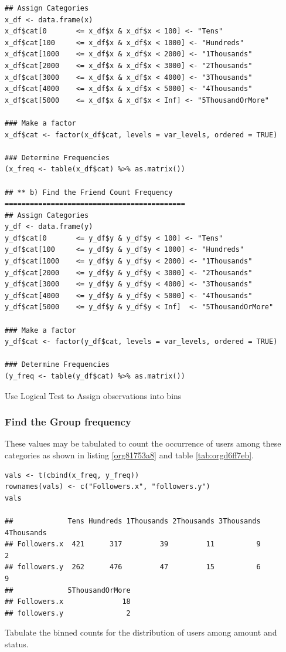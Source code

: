 \documentclass[11pt]{article}
\begin{document}
\begin{listing}[htbp]
\begin{verbatim}
## Assign Categories
x_df <- data.frame(x)
x_df$cat[0       <= x_df$x & x_df$x < 100] <- "Tens"
x_df$cat[100     <= x_df$x & x_df$x < 1000] <- "Hundreds"
x_df$cat[1000    <= x_df$x & x_df$x < 2000] <- "1Thousands"
x_df$cat[2000    <= x_df$x & x_df$x < 3000] <- "2Thousands"
x_df$cat[3000    <= x_df$x & x_df$x < 4000] <- "3Thousands"
x_df$cat[4000    <= x_df$x & x_df$x < 5000] <- "4Thousands"
x_df$cat[5000    <= x_df$x & x_df$x < Inf] <- "5ThousandOrMore"

### Make a factor
x_df$cat <- factor(x_df$cat, levels = var_levels, ordered = TRUE)

### Determine Frequencies
(x_freq <- table(x_df$cat) %>% as.matrix())

## ** b) Find the Friend Count Frequency ===========================================
## Assign Categories
y_df <- data.frame(y)
y_df$cat[0       <= y_df$y & y_df$y < 100] <- "Tens"
y_df$cat[100     <= y_df$y & y_df$y < 1000] <- "Hundreds"
y_df$cat[1000    <= y_df$y & y_df$y < 2000] <- "1Thousands"
y_df$cat[2000    <= y_df$y & y_df$y < 3000] <- "2Thousands"
y_df$cat[3000    <= y_df$y & y_df$y < 4000] <- "3Thousands"
y_df$cat[4000    <= y_df$y & y_df$y < 5000] <- "4Thousands"
y_df$cat[5000    <= y_df$y & y_df$y < Inf]  <- "5ThousandOrMore"

### Make a factor
y_df$cat <- factor(y_df$cat, levels = var_levels, ordered = TRUE)

### Determine Frequencies
(y_freq <- table(y_df$cat) %>% as.matrix())
\end{verbatim}
\caption{\label{org6396c64}Use Logical Test to Assign observations into bins}
\end{listing}

\subsubsection{Find the Group frequency}
\label{sec:orgc0f4c17}
These values may be tabulated to count the occurrence of users among these categories as shown in listing \ref{org81753a8} and table \ref{tab:orgd6ff7eb}.

\begin{listing}[htbp]
\begin{verbatim}
vals <- t(cbind(x_freq, y_freq))
rownames(vals) <- c("Followers.x", "followers.y")
vals

##             Tens Hundreds 1Thousands 2Thousands 3Thousands 4Thousands
## Followers.x  421      317         39         11          9          2
## followers.y  262      476         47         15          6          9
##             5ThousandOrMore
## Followers.x              18
## followers.y               2
\end{verbatim}
\caption{\label{org81753a8}Tabulate the binned counts for the distribution of users among amount and status.}
\end{listing}
\end{document}
